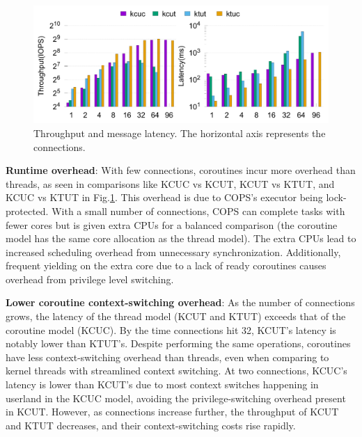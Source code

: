 \documentclass[conference]{IEEEtran}
\begin{document}
\begin{figure}[tbp]
	\centering
  \includegraphics[width=\linewidth]{assets/tl.pdf}
	\caption{Throughput and message latency. The horizontal axis represents the connections.}
	\label{fig:throughput-latency}
  \vspace{-1em}
\end{figure}

\textbf{Runtime overhead}: With few connections, coroutines incur more overhead than threads, as seen in comparisons like KCUC vs KCUT, KCUT vs KTUT, and KCUC vs KTUT in Fig.\ref{fig:throughput-latency}. This overhead is due to COPS's executor being lock-protected. With a small number of connections, COPS can complete tasks with fewer cores but is given extra CPUs for a balanced comparison (the coroutine model has the same core allocation as the thread model). The extra CPUs lead to increased scheduling overhead from unnecessary synchronization. Additionally, frequent yielding on the extra core due to a lack of ready coroutines causes overhead from privilege level switching.

\textbf{Lower coroutine context-switching overhead}: As the number of connections grows, the latency of the thread model (KCUT and KTUT) exceeds that of the coroutine model (KCUC). By the time connections hit 32, KCUT's latency is notably lower than KTUT's. Despite performing the same operations, coroutines have less context-switching overhead than threads, even when comparing to kernel threads with streamlined context switching. At two connections, KCUC's latency is lower than KCUT's due to most context switches happening in userland in the KCUC model, avoiding the privilege-switching overhead present in KCUT. However, as connections increase further, the throughput of KCUT and KTUT decreases, and their context-switching costs rise rapidly.
\end{document}
